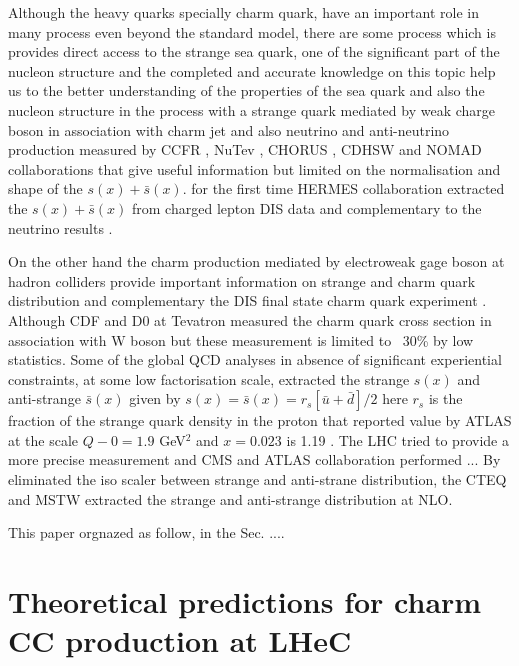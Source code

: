 \documentclass[pdftex,twocolumn,epjc3]{svjour3}          %
\begin{document}
 Although the heavy quarks specially charm quark, have an important role in many process even beyond the standard model, there are some process which is provides direct access to the strange sea quark, one of the significant part of the nucleon structure and  the completed and accurate knowledge on this topic help us to the better understanding of the properties of the sea quark and also the nucleon structure in the process with a strange quark mediated by weak charge boson in association with charm jet \cite{Abazov:2014fka, Lai:2007dq} and also neutrino and anti-neutrino production measured by CCFR \cite{Seligman:1997mc}, NuTev \cite{Tzanov:2005kr}, CHORUS \cite{Onengut:2005kv}, CDHSW \cite{Berge:1989hr} and NOMAD \cite{Samoylov:2013xoa} collaborations that give useful information but limited on the normalisation and shape of the $s(x)+ \bar{s}(x)$. for the first time HERMES collaboration extracted the $s(x)+ \bar{s}(x)$ from charged lepton DIS data and complementary to the neutrino results \cite{Airapetian:2008qf}.

On the other hand the charm production mediated by electroweak gage boson at hadron colliders provide important information on strange and charm quark distribution and complementary the DIS final state charm quark experiment \cite{Lai:2007dq}. Although CDF and D0 at Tevatron \cite{Aaltonen:2007dm, Abazov:2008qz} measured the charm quark cross section in association with W boson but these measurement is limited to ~30\% by low statistics. 
Some of the global QCD analyses in absence of significant experiential constraints, at some low factorisation scale, extracted the strange $s(x)$ and anti-strange $\bar{s}(x)$ given by 
$s(x)= \bar{s}(x)=r_s[\bar{u}+\bar{d}]/2$ \cite{Kretzer:2003it, Martin:2004ir} here $r_s$ is the fraction of the strange quark density in the proton that reported value by ATLAS at the scale $Q-0 = 1.9$ GeV$^2$ and $x= 0.023$ is  1.19 \cite{Aaboud:2016btc}. The LHC tried to provide a more precise measurement and CMS and ATLAS collaboration performed ... By eliminated the iso scaler between strange and anti-strane distribution, the CTEQ \cite{Lai:2007dq} and MSTW \cite{Martin:2009iq} extracted the strange and anti-strange distribution at NLO. 

This paper orgnazed as follow, in the Sec. ....
 

\section{Theoretical predictions for charm CC production at LHeC}
\label{sec:thpred}
\end{document}
